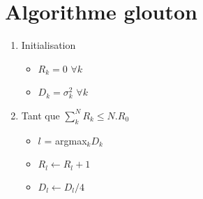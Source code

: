 \documentclass{article}
\begin{document}
\section{Algorithme glouton}
\label{greedy_algo}
\begin{enumerate}[label=\textbf{\arabic*})]
	\item Initialisation
	\begin{itemize}
		\item $R_k = 0$ $\forall k$
		\item $D_k = \sigma_k^2$ $\forall k$
	\end{itemize}
	\item Tant que $\sum\limits_k^N R_k \leqslant N.R_0$
	\begin{itemize}
		\item $l$ = argmax$_k D_k$
		\item $R_l \leftarrow R_l + 1$
		\item $D_l \leftarrow D_l/4$
	\end{itemize}
\end{enumerate}
\end{document}
